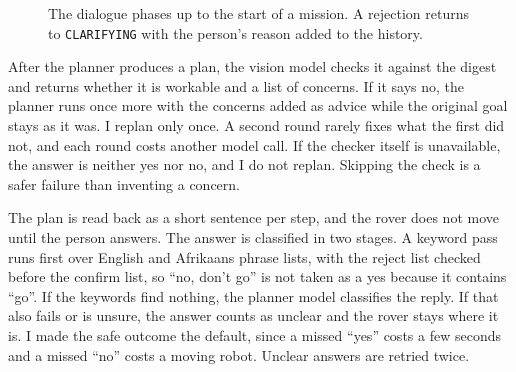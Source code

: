 \begin{figure}[htbp]
  \centering
  \caption{The dialogue phases up to the start of a mission. A rejection returns to \texttt{CLARIFYING} with the person's reason added to the history.}
  \label{fig:states}
\end{figure}

\label{ssec:plancheck}

After the planner produces a plan, the vision model checks it against the digest
and returns whether it is workable and a list of concerns. If it says no, the
planner runs once more with the concerns added as advice while the original goal
stays as it was. I replan only once. A second round rarely fixes what the first
did not, and each round costs another model call. If the checker itself is
unavailable, the answer is neither yes nor no, and I do not replan. Skipping the
check is a safer failure than inventing a concern.

\label{ssec:confirmation}

The plan is read back as a short sentence per step, and the rover does not move
until the person answers. The answer is classified in two stages. A keyword pass
runs first over English and Afrikaans phrase lists, with the reject list checked
before the confirm list, so ``no, don't go'' is not taken as a yes because it
contains ``go''. If the keywords find nothing, the planner model classifies the
reply. If that also fails or is unsure, the answer counts as unclear and the rover
stays where it is. I made the safe outcome the default, since a missed ``yes''
costs a few seconds and a missed ``no'' costs a moving robot. Unclear answers are
retried twice.

